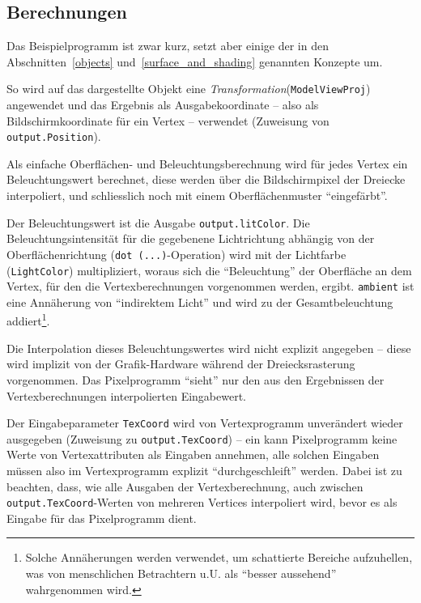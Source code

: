 \documentclass[twoside,a4paper,fleqn,12pt]{book}
\begin{document}
\subsection{Berechnungen}


Das Beispielprogramm ist zwar kurz, setzt aber einige der in den Abschnitten~\ref{objects} und~\ref{surface_and_shading} genannten Konzepte um.

So wird auf das dargestellte Objekt eine \emph{Transformation}(\verb+ModelViewProj+) angewendet und das Ergebnis als Ausgabekoordinate --
also als Bildschirmkoordinate für ein Vertex -- verwendet (Zuweisung von \verb+output.Position+).

Als einfache Oberflächen- und Beleuchtungsberechnung wird für jedes Vertex ein Beleuchtungswert berechnet, diese werden über die Bildschirmpixel
der Dreiecke interpoliert, und schliesslich noch mit einem Oberflächenmuster "`eingefärbt"'.

Der Beleuchtungswert ist die Ausgabe \verb+output.litColor+. Die Beleuchtungsintensität für die gegebenene Lichtrichtung abhängig von der Oberflächenrichtung
(\verb+dot (...)+-Operation) wird mit der Lichtfarbe (\verb+LightColor+) multipliziert, woraus sich die "`Beleuchtung"' der Oberfläche an dem
Vertex, für den die Vertexberechnungen vorgenommen werden, ergibt. \verb+ambient+ ist eine Annäherung von "`indirektem Licht"' und wird
zu der Gesamtbeleuchtung addiert\footnote{Solche Annäherungen werden verwendet, um schattierte Bereiche aufzuhellen, was von
menschlichen Betrachtern u.U. als "`besser aussehend"' wahrgenommen wird.}.

Die Interpolation dieses Beleuchtungswertes wird nicht explizit angegeben -- diese wird implizit von der Grafik-Hardware während der Dreiecksrasterung
vorgenommen. Das Pixelprogramm "`sieht"' nur den aus den Ergebnissen der Vertexberechnungen interpolierten Eingabewert.

Der Eingabeparameter \verb+TexCoord+ wird von Vertexprogramm unverändert wieder ausgegeben (Zuweisung zu \verb+output.TexCoord+) --
ein kann Pixelprogramm keine Werte von Vertexattributen als Eingaben annehmen, alle solchen Eingaben müssen also im Vertexprogramm
explizit "`durchgeschleift"' werden. Dabei ist zu beachten, dass, wie alle Ausgaben der Vertexberechnung, auch zwischen \verb+output.TexCoord+-Werten
von mehreren Vertices interpoliert wird, bevor es als Eingabe für das Pixelprogramm dient.
\end{document}
